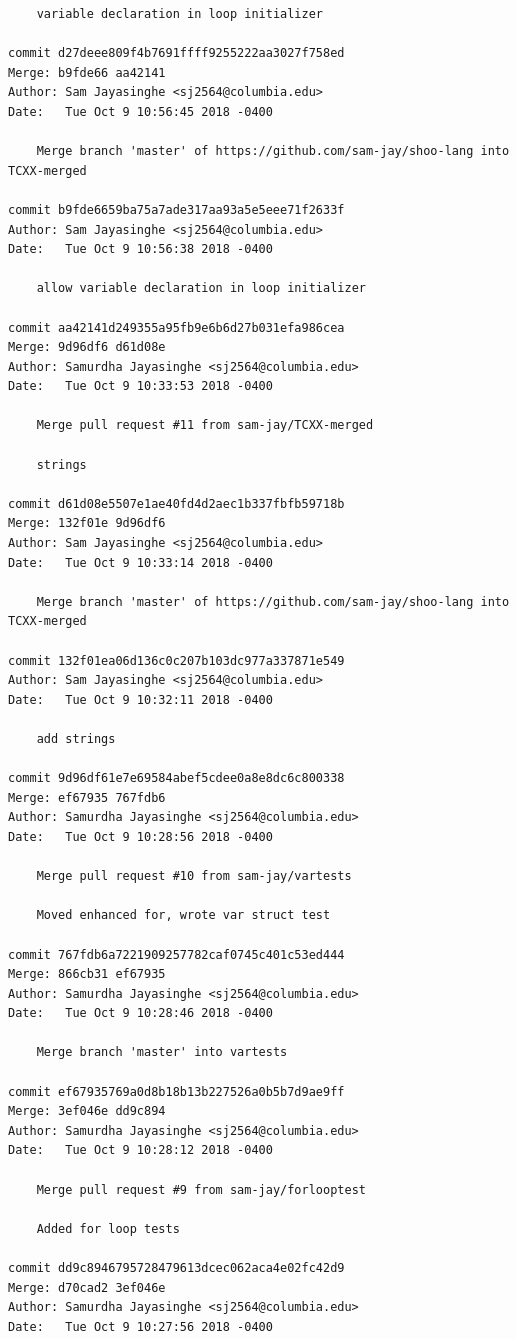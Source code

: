 \documentclass[12pt]{article}
\begin{document}
\begin{lstlisting}
    variable declaration in loop initializer

commit d27deee809f4b7691ffff9255222aa3027f758ed
Merge: b9fde66 aa42141
Author: Sam Jayasinghe <sj2564@columbia.edu>
Date:   Tue Oct 9 10:56:45 2018 -0400

    Merge branch 'master' of https://github.com/sam-jay/shoo-lang into TCXX-merged

commit b9fde6659ba75a7ade317aa93a5e5eee71f2633f
Author: Sam Jayasinghe <sj2564@columbia.edu>
Date:   Tue Oct 9 10:56:38 2018 -0400

    allow variable declaration in loop initializer

commit aa42141d249355a95fb9e6b6d27b031efa986cea
Merge: 9d96df6 d61d08e
Author: Samurdha Jayasinghe <sj2564@columbia.edu>
Date:   Tue Oct 9 10:33:53 2018 -0400

    Merge pull request #11 from sam-jay/TCXX-merged
    
    strings

commit d61d08e5507e1ae40fd4d2aec1b337fbfb59718b
Merge: 132f01e 9d96df6
Author: Sam Jayasinghe <sj2564@columbia.edu>
Date:   Tue Oct 9 10:33:14 2018 -0400

    Merge branch 'master' of https://github.com/sam-jay/shoo-lang into TCXX-merged

commit 132f01ea06d136c0c207b103dc977a337871e549
Author: Sam Jayasinghe <sj2564@columbia.edu>
Date:   Tue Oct 9 10:32:11 2018 -0400

    add strings

commit 9d96df61e7e69584abef5cdee0a8e8dc6c800338
Merge: ef67935 767fdb6
Author: Samurdha Jayasinghe <sj2564@columbia.edu>
Date:   Tue Oct 9 10:28:56 2018 -0400

    Merge pull request #10 from sam-jay/vartests
    
    Moved enhanced for, wrote var struct test

commit 767fdb6a7221909257782caf0745c401c53ed444
Merge: 866cb31 ef67935
Author: Samurdha Jayasinghe <sj2564@columbia.edu>
Date:   Tue Oct 9 10:28:46 2018 -0400

    Merge branch 'master' into vartests

commit ef67935769a0d8b18b13b227526a0b5b7d9ae9ff
Merge: 3ef046e dd9c894
Author: Samurdha Jayasinghe <sj2564@columbia.edu>
Date:   Tue Oct 9 10:28:12 2018 -0400

    Merge pull request #9 from sam-jay/forlooptest
    
    Added for loop tests

commit dd9c8946795728479613dcec062aca4e02fc42d9
Merge: d70cad2 3ef046e
Author: Samurdha Jayasinghe <sj2564@columbia.edu>
Date:   Tue Oct 9 10:27:56 2018 -0400


\end{lstlisting}
\end{document}
